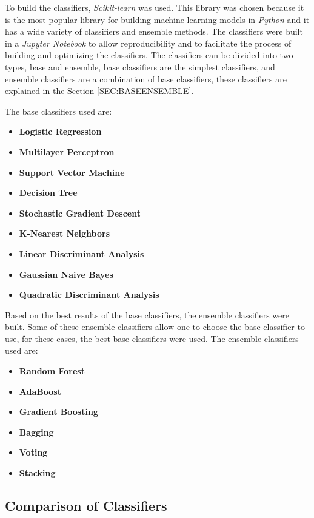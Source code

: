 To build the classifiers, \textit{Scikit-learn} was used. This library was chosen because it is the most popular library for building machine learning models in \textit{Python} and it has a wide variety of classifiers and ensemble methods. The classifiers were built in a \textit{Jupyter Notebook} to allow reproducibility and to facilitate the process of building and optimizing the classifiers. The classifiers can be divided into two types, base and ensemble, base classifiers are the simplest classifiers, and ensemble classifiers are a combination of base classifiers, these classifiers are explained in the Section \ref{SEC:BASEENSEMBLE}.

The base classifiers used are:
\begin{itemize}
    \item \textbf{Logistic Regression}
    \item \textbf{Multilayer Perceptron}
    \item \textbf{Support Vector Machine}
    \item \textbf{Decision Tree}
    \item \textbf{Stochastic Gradient Descent}
    \item \textbf{K-Nearest Neighbors}
    \item \textbf{Linear Discriminant Analysis}
    \item \textbf{Gaussian Naive Bayes}
    \item \textbf{Quadratic Discriminant Analysis}
\end{itemize}

Based on the best results of the base classifiers, the ensemble classifiers were built. Some of these ensemble classifiers allow one to choose the base classifier to use, for these cases, the best base classifiers were used. The ensemble classifiers used are:
\begin{itemize}
    \item \textbf{Random Forest}
    \item \textbf{AdaBoost}
    \item \textbf{Gradient Boosting}
    \item \textbf{Bagging}
    \item \textbf{Voting}
    \item \textbf{Stacking}
\end{itemize}

\subsection{Comparison of Classifiers}

